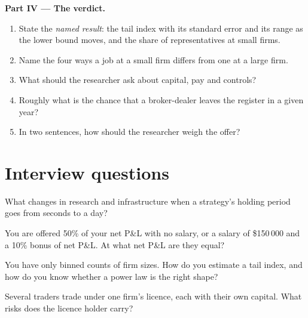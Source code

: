 \begin{problem}
\medskip\noindent\textbf{Part IV --- The verdict.}
\begin{enumerate}[resume]
\item State the \emph{named result}: the tail index with its standard error and its range as the lower bound moves, and
the share of representatives at small firms.
\item Name the four ways a job at a small firm differs from one at a large firm.
\item What should the researcher ask about capital, pay and controls?
\item Roughly what is the chance that a broker-dealer leaves the register in a given year?
\item In two sentences, how should the researcher weigh the offer?
\end{enumerate}
\end{problem}

\section{Interview questions}

\begin{interviewq}\label{iq:in:medium-frequency-proprietary-shops:1}
What changes in research and infrastructure when a strategy's holding period goes from seconds to a day?
\end{interviewq}

\begin{interviewq}\label{iq:in:medium-frequency-proprietary-shops:2}
You are offered 50\% of your net P\&L with no salary, or a salary of \$150\,000 and a 10\% bonus of net P\&L. At what
net P\&L are they equal?
\end{interviewq}

\begin{interviewq}\label{iq:in:medium-frequency-proprietary-shops:3}
You have only binned counts of firm sizes. How do you estimate a tail index, and how do you know whether a power law is
the right shape?
\end{interviewq}

\begin{interviewq}\label{iq:in:medium-frequency-proprietary-shops:4}
Several traders trade under one firm's licence, each with their own capital. What risks does the licence holder carry?
\end{interviewq}

